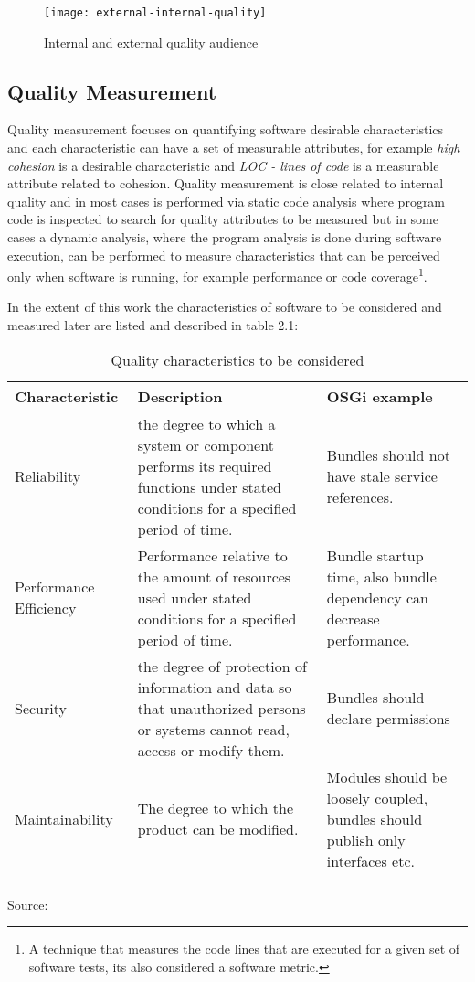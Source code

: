 \begin{figure}[h]
\caption{Internal and external quality audience}
\centering
\texttt{[image: external-internal-quality]}
\end{figure}
\FloatBarrier


\subsection{Quality Measurement}
Quality measurement focuses on quantifying software desirable characteristics and each characteristic can have a set of measurable attributes, for example \textit{high cohesion} is a desirable characteristic and \textit{LOC - lines of code} is a measurable attribute related to cohesion. Quality measurement is close related to internal quality and in most cases is performed via static code analysis where program code is inspected to search for quality attributes to be measured but in some cases a dynamic analysis, where the program analysis is done during software execution, can be performed to measure characteristics that can be perceived only when software is running, for example performance or code coverage\footnote{A technique that measures the code lines that are executed for a given set of software tests, its also considered a software metric.}.     

In the extent of this work the characteristics of software to be considered and measured later are listed and described in table 2.1:  

\begin{table}[h]
\caption{Quality characteristics to be considered}
\begin{center}
    \begin{tabular}{  p{3cm} | p{8cm} | p{5cm} }
    \Xhline{2\arrayrulewidth}
    Characteristic & Description & OSGi example \\  \hline
    Reliability & the degree to which a system or component performs its required functions under stated conditions for a specified period of time. & Bundles should not have stale service references.\\ \hline
    Performance Efficiency & Performance relative to the amount of resources used under stated conditions for a specified
period of time. & Bundle startup time, also bundle dependency can decrease performance. \\ \hline
    Security & the degree of protection of information and data so that unauthorized persons or systems cannot read, access or modify them. & Bundles should declare permissions \\ \hline
    Maintainability & The degree to which the product can be modified. & Modules should be loosely coupled, bundles should publish only interfaces etc. \\ 
    \Xhline{2\arrayrulewidth}
     
    \end{tabular}
    Source: \cite{cisq 2012}
\end{center}
\end{table}
\FloatBarrier

